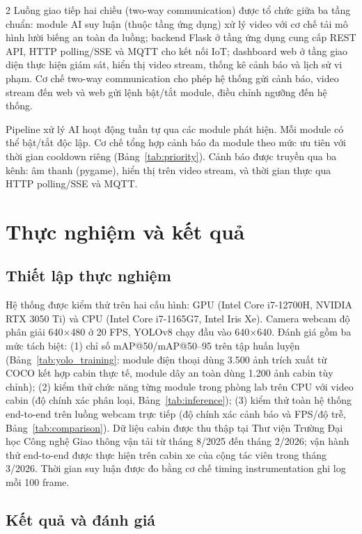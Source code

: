 \documentclass[10pt]{article}
\begin{document}
\begin{multicols}{2}
Luồng giao tiếp hai chiều (two-way communication) được tổ chức giữa ba tầng chuẩn: module AI suy luận (thuộc tầng ứng dụng) xử lý video với cơ chế tải mô hình lười biếng an toàn đa luồng; backend Flask ở tầng ứng dụng cung cấp REST API, HTTP polling/SSE và MQTT cho kết nối IoT; \mbox{dashboard} web ở tầng giao diện thực hiện giám sát, hiển thị video \mbox{stream}, thống kê cảnh báo và lịch sử vi phạm. Cơ chế two-way communication cho phép hệ thống gửi cảnh báo, video \mbox{stream} đến web và web gửi lệnh bật/tắt module, điều chỉnh ngưỡng đến hệ thống.

Pipeline xử lý AI hoạt động tuần tự qua các module phát hiện. Mỗi module có thể bật/tắt độc lập. Cơ chế tổng hợp cảnh báo đa module theo mức ưu tiên với thời gian cooldown riêng (Bảng~\ref{tab:priority}). Cảnh báo được truyền qua ba kênh: âm thanh (pygame), hiển thị trên video stream, và thời gian thực qua HTTP polling/SSE và MQTT.

\section{Thực nghiệm và kết quả}

\subsection{Thiết lập thực nghiệm}

Hệ thống được kiểm thử trên hai cấu hình: GPU (Intel Core i7-12700H, NVIDIA RTX 3050 Ti) và CPU (Intel Core i7-1165G7, Intel Iris Xe). Camera webcam độ phân giải 640$\times$480 ở 20 FPS, YOLOv8 chạy đầu vào 640$\times$640. Đánh giá gồm ba mức tách biệt: (1) chỉ số mAP@50/mAP@50--95 trên tập huấn luyện (Bảng~\ref{tab:yolo_training}: module điện thoại dùng 3.500 ảnh trích xuất từ COCO kết hợp cabin thực tế, module dây an toàn dùng 1.200 ảnh cabin tùy chỉnh); (2) kiểm thử chức năng từng module trong phòng lab trên CPU với video cabin (độ chính xác phân loại, Bảng~\ref{tab:inference}); (3) kiểm thử toàn hệ thống end-to-end trên luồng webcam trực tiếp (độ chính xác cảnh báo và FPS/độ trễ, Bảng~\ref{tab:comparison}). Dữ liệu cabin được thu thập tại Thư viện Trường Đại học Công nghệ Giao thông vận tải từ tháng 8/2025 đến tháng 2/2026; vận hành thử end-to-end được thực hiện trên cabin xe của cộng tác viên trong tháng 3/2026. Thời gian suy luận được đo bằng cơ chế timing instrumentation ghi log mỗi 100 frame.

\subsection{Kết quả và đánh giá}


\end{multicols}
\end{document}

